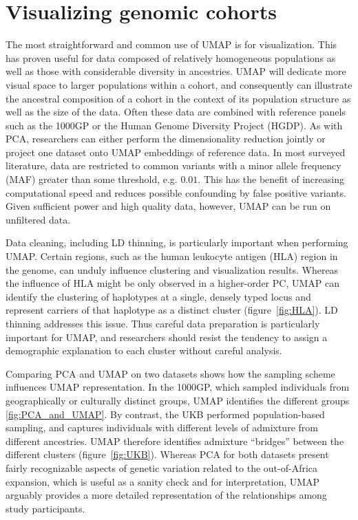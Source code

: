 \documentclass[12pt]{article}
\begin{document}
\section*{Visualizing genomic cohorts}
The most straightforward and common use of UMAP is for visualization. This has proven useful for data composed of relatively homogeneous populations as well as those with considerable diversity in ancestries. UMAP will dedicate more visual space to larger populations within a cohort, and consequently can illustrate the ancestral composition of a cohort in the context of its population structure as well as the size of the data. Often these data are combined with reference panels such as the 1000GP or the Human Genome Diversity Project (HGDP)\cite{cann2002human}.  As with PCA, researchers can either perform the dimensionality reduction jointly or project one dataset onto UMAP embeddings of reference data. In most surveyed literature, data are restricted to common variants with a minor allele frequency (MAF) greater than some threshold, e.g. $0.01$. This has the benefit of increasing computational speed and reduces possible confounding by false positive variants. Given sufficient power and high quality data, however, UMAP can be run on unfiltered data.

Data cleaning, including LD thinning, is particularly important when performing UMAP. Certain regions, such as the human leukocyte antigen (HLA) region in the genome, can unduly influence clustering and visualization results. Whereas the influence of HLA might be only observed in a higher-order PC, UMAP can identify the clustering of haplotypes at a single, densely typed locus and represent carriers of that haplotype as a distinct cluster (figure~\ref{fig:HLA}). LD thinning addresses this issue. Thus careful data preparation is particularly important for UMAP, and researchers should resist the tendency to assign a demographic explanation to each cluster without careful analysis. 

Comparing PCA and UMAP on two datasets shows how the sampling scheme influences UMAP representation. In the 1000GP, which sampled individuals from geographically or culturally distinct groups, UMAP identifies the different groups \ref{fig:PCA_and_UMAP}. By contrast, the UKB performed population-based sampling, and captures individuals with different levels of admixture from different ancestries. UMAP therefore identifies admixture ``bridges'' between the different clusters (figure~\ref{fig:UKB}). Whereas PCA for both datasets present fairly recognizable aspects of genetic variation related to the out-of-Africa expansion, which is useful as a sanity check and for interpretation, UMAP arguably provides a more detailed representation of the relationships among study participants. 
\end{document}
